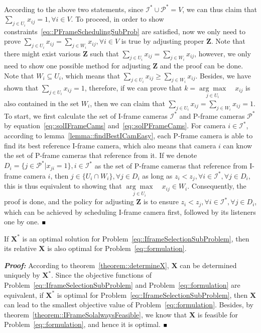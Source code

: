 According to the above two statements, since $\mathcal{I}^* \cup \mathcal{P}^* = V$, we can thus claim that ${\underset{j \in U_i}{\sum} x_{ij}=1},{\forall i \in V}$.
To proceed, in order to show constraints~\eqref{eq::PFrameSchedulingSubProb} are satisfied, now we only need to prove ${\underset{j \in U_i}{\sum} x_{ij} = \underset{j \in W_i}{\sum} x_{ij}},{\forall i \in V}$ is true by adjusting proper $\mathbf{Z}$.
Note that there might exist various $\mathbf{Z}$ such that ${\underset{j \in U_i}{\sum} x_{ij} = \underset{j \in W_i}{\sum} x_{ij}}$, however, we only need to show one possible method for adjusting $\mathbf{Z}$ and the proof can be done.
Note that $W_i \subseteq U_i$, which means that ${\underset{j \in U_i}{\sum} x_{ij} \geq \underset{j \in W_i}{\sum} x_{ij}}$.
Besides, we have shown that ${\underset{j \in U_i}{\sum} x_{ij}=1}$, therefore, if we can prove that ${k = \underset{j \in U_i}{\arg \max} \quad x_{ij}}$ is also contained in the set $W_i$, then we can claim that ${\underset{j \in U_i}{\sum} x_{ij} = \underset{j \in W_i}{\sum} x_{ij} = 1}$.
To start, we first calculate the set of I-frame cameras $\mathcal{I}^*$ and P-frame cameras $\mathcal{P}^*$ by equation~\eqref{eq::solIFrameCams} and~\eqref{eq::solPFrameCams}.
For camera $i \in \mathcal{I}^*$, according to lemma~\ref{lemma::findBestICamEasy}, each P-frame camera is able to find its best reference I-frame camera, which also means that camera $i$ can know the set of P-frame cameras that reference from it.
If we denote ${D_i= \{j \in \mathcal{P}^*|x_{ji} = 1\}},{i \in \mathcal{I}^*}$ as the set of P-frame cameras that reference from I-frame camera $i$, then ${j \in \{U_i \cap W_i\}},{\forall j \in D_i}$ as long as ${z_i < z_j}, {\forall i \in \mathcal{I}^*},{\forall j \in D_i}$, this is thus equivalent to showing that ${\underset{j \in U_i}{\arg \max} \quad x_{ij} \in W_i}$.
Consequently, the proof is done, and the policy for adjusting $\mathbf{Z}$ is to ensure ${z_i < z_j}, {\forall i \in \mathcal{I}^*},{\forall j \in D_i}$, which can be achieved by scheduling I-frame camera first, followed by its listeners one by one.
\hfill$\mathsmaller{\mathsmaller{\blacksquare}}$
%
\begin{mythm}
If $\mathbf{X}^*$ is an optimal solution for Problem~\eqref{eq::IframeSelectionSubProblem}, then its relative $\mathbf{X}$ is also optimal for Problem~\eqref{eq::formulation}.
\label{theorem::optimalIsOptimal}
\end{mythm}
\textbf{\emph{Proof:}}
According to theorem~\ref{theorem::determineX}, $\mathbf{X}$ can be determined uniquely by $\mathbf{X}^*$.
Since the objective functions of Problem~\eqref{eq::IframeSelectionSubProblem} and Problem~\eqref{eq::formulation} are equivalent, if $\mathbf{X}^*$ is optimal for Problem~\eqref{eq::IframeSelectionSubProblem}, then $\mathbf{X}$ can lead to the smallest objective value of Problem~\eqref{eq::formulation}.
Besides, by theorem~\ref{theorem::IFrameSolalwaysFeasible}, we know that $\mathbf{X}$ is feasible for Problem~\eqref{eq::formulation}, and hence it is optimal.
\hfill$\mathsmaller{\mathsmaller{\blacksquare}}$

